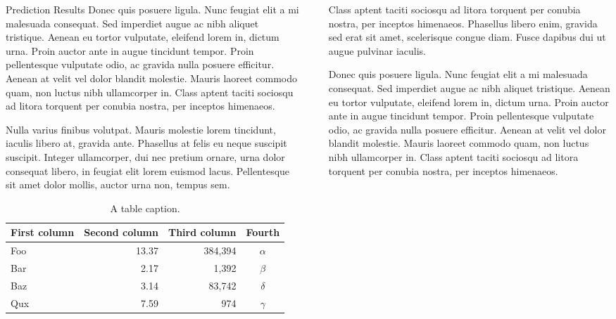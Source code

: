 \documentclass[final]{beamer}
\newlength{\sepwidth}
\newlength{\colwidth}
\newcommand{\separatorcolumn}{\begin{column}{\sepwidth}\end{column}}
\begin{document}
\begin{frame}[t]
\begin{columns}[t]
\begin{column}{\colwidth}
\begin{block}{Prediction Results}
    Donec quis posuere ligula. Nunc feugiat elit a mi malesuada consequat. Sed
    imperdiet augue ac nibh aliquet tristique. Aenean eu tortor vulputate,
    eleifend lorem in, dictum urna. Proin auctor ante in augue tincidunt
    tempor. Proin pellentesque vulputate odio, ac gravida nulla posuere
    efficitur. Aenean at velit vel dolor blandit molestie. Mauris laoreet
    commodo quam, non luctus nibh ullamcorper in. Class aptent taciti sociosqu
    ad litora torquent per conubia nostra, per inceptos himenaeos.

    Nulla varius finibus volutpat. Mauris molestie lorem tincidunt, iaculis
    libero at, gravida ante. Phasellus at felis eu neque suscipit suscipit.
    Integer ullamcorper, dui nec pretium ornare, urna dolor consequat libero,
    in feugiat elit lorem euismod lacus. Pellentesque sit amet dolor mollis,
    auctor urna non, tempus sem.
\begin{table}
      \centering
      \begin{tabular}{l r r c}
        \toprule
        \textbf{First column} & \textbf{Second column} & \textbf{Third column} & \textbf{Fourth} \\
        \midrule
        Foo & 13.37 & 384,394 & $\alpha$ \\
        Bar & 2.17 & 1,392 & $\beta$ \\
        Baz & 3.14 & 83,742 & $\delta$ \\
        Qux & 7.59 & 974 & $\gamma$ \\
        \bottomrule
      \end{tabular}
      \caption{A table caption.}
    \end{table}
  \end{block}

  

\end{column}

\separatorcolumn

\begin{column}{\colwidth}

  \begin{block}{}

    Class aptent taciti sociosqu ad litora torquent per conubia nostra, per
    inceptos himenaeos. Phasellus libero enim, gravida sed erat sit amet,
    scelerisque congue diam. Fusce dapibus dui ut augue pulvinar iaculis.


    Donec quis posuere ligula. Nunc feugiat elit a mi malesuada consequat. Sed
    imperdiet augue ac nibh aliquet tristique. Aenean eu tortor vulputate,
    eleifend lorem in, dictum urna. Proin auctor ante in augue tincidunt
    tempor. Proin pellentesque vulputate odio, ac gravida nulla posuere
    efficitur. Aenean at velit vel dolor blandit molestie. Mauris laoreet
    commodo quam, non luctus nibh ullamcorper in. Class aptent taciti sociosqu
    ad litora torquent per conubia nostra, per inceptos himenaeos.


\end{block}
\end{column}
\end{columns}
\end{frame}
\end{document}
